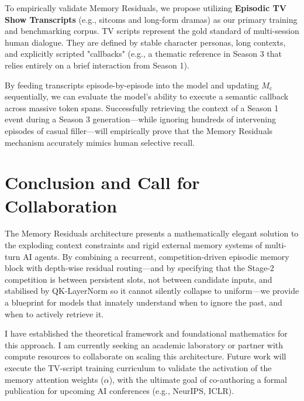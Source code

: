 \documentclass[11pt, a4paper]{article}
\begin{document}
To empirically validate Memory Residuals, we propose utilizing \textbf{Episodic TV Show Transcripts} (e.g., sitcoms and long-form dramas) as our primary training and benchmarking corpus. TV scripts represent the gold standard of multi-session human dialogue. They are defined by stable character personas, long contexts, and explicitly scripted "callbacks" (e.g., a thematic reference in Season 3 that relies entirely on a brief interaction from Season 1).

By feeding transcripts episode-by-episode into the model and updating $M_{\text{c}}$ sequentially, we can evaluate the model's ability to execute a semantic callback across massive token spans. Successfully retrieving the context of a Season 1 event during a Season 3 generation—while ignoring hundreds of intervening episodes of casual filler—will empirically prove that the Memory Residuals mechanism accurately mimics human selective recall.

\section{Conclusion and Call for Collaboration}
The Memory Residuals architecture presents a mathematically elegant solution to the exploding context constraints and rigid external memory systems of multi-turn AI agents. By combining a recurrent, competition-driven episodic memory block with depth-wise residual routing---and by specifying that the Stage-2 competition is between persistent slots, not between candidate inputs, and stabilised by QK-LayerNorm so it cannot silently collapse to uniform---we provide a blueprint for models that innately understand when to ignore the past, and when to actively retrieve it.

I have established the theoretical framework and foundational mathematics for this approach. I am currently seeking an academic laboratory or partner with compute resources to collaborate on scaling this architecture. Future work will execute the TV-script training curriculum to validate the activation of the memory attention weights ($\alpha$), with the ultimate goal of co-authoring a formal publication for upcoming AI conferences (e.g., NeurIPS, ICLR).
\end{document}
